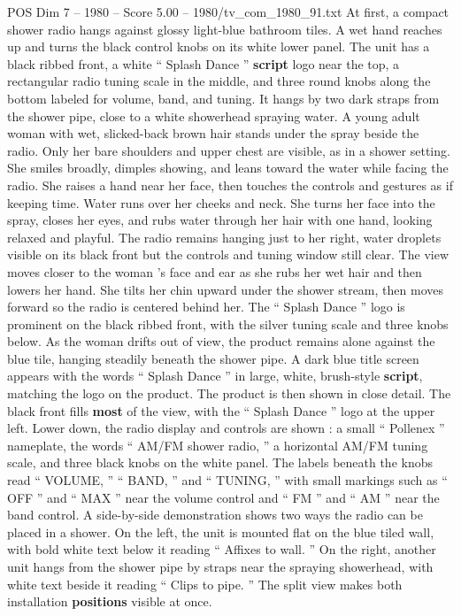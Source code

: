 \begin{textsample}{POS Dim 7 – 1980 – Score 5.00 – 1980/tv\_com\_1980\_91.txt}  \label{ex:f7_pos_050}
At first, a compact shower radio hangs against glossy light-blue bathroom tiles.
A wet hand reaches up and turns the black control knobs on its white lower panel.
The unit has a black ribbed front, a white “ Splash Dance ” \textbf{script} logo near the top, a rectangular radio tuning scale in the middle, and three round knobs along the bottom labeled for volume, band, and tuning.
It hangs by two dark straps from the shower pipe, close to a white showerhead spraying water.
A young adult woman with wet, slicked-back brown hair stands under the spray beside the radio.
Only her bare shoulders and upper chest are visible, as in a shower setting.
She smiles broadly, dimples showing, and leans toward the water while facing the radio.
She raises a hand near her face, then touches the controls and gestures as if keeping time.
Water runs over her cheeks and neck.
She turns her face into the spray, closes her eyes, and rubs water through her hair with one hand, looking relaxed and playful.
The radio remains hanging just to her right, water droplets visible on its black front but the controls and tuning window still clear.
The view moves closer to the woman ’s face and ear as she rubs her wet hair and then lowers her hand.
She tilts her chin upward under the shower stream, then moves forward so the radio is centered behind her.
The “ Splash Dance ” logo is prominent on the black ribbed front, with the silver tuning scale and three knobs below.
As the woman drifts out of view, the product remains alone against the blue tile, hanging steadily beneath the shower pipe.
A dark blue title screen appears with the words “ Splash Dance ” in large, white, brush-style \textbf{script}, matching the logo on the product.
The product is then shown in close detail.
The black front fills \textbf{most} of the view, with the “ Splash Dance ” logo at the upper left.
Lower down, the radio display and controls are shown : a small “ Pollenex ” nameplate, the words “ AM/FM shower radio, ” a horizontal AM/FM tuning scale, and three black knobs on the white panel.
The labels beneath the knobs read “ VOLUME, ” “ BAND, ” and “ TUNING, ” with small markings such as “ OFF ” and “ MAX ” near the volume control and “ FM ” and “ AM ” near the band control.
A side-by-side demonstration shows two ways the radio can be placed in a shower.
On the left, the unit is mounted flat on the blue tiled wall, with bold white text below it reading “ Affixes to wall. ” On the right, another unit hangs from the shower pipe by straps near the spraying showerhead, with white text beside it reading “ Clips to pipe. ” The split view makes both installation \textbf{positions} visible at once.

\end{textsample}
